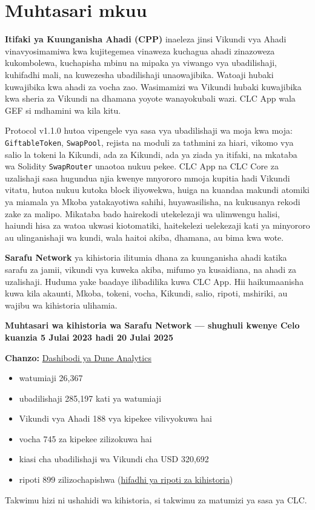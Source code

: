 \documentclass[11pt]{article}
\begin{document}
\section*{Muhtasari mkuu}

\textbf{Itifaki ya Kuunganisha Ahadi (CPP)} inaeleza jinsi Vikundi vya Ahadi vinavyosimamiwa kwa kujitegemea vinaweza kuchagua ahadi zinazoweza kukombolewa, kuchapisha mbinu na mipaka ya viwango vya ubadilishaji, kuhifadhi mali, na kuwezesha ubadilishaji unaowajibika. Watoaji hubaki kuwajibika kwa ahadi za vocha zao. Wasimamizi wa Vikundi hubaki kuwajibika kwa sheria za Vikundi na dhamana yoyote wanayokubali wazi. CLC App wala GEF si mdhamini wa kila kitu.

Protocol v1.1.0 hutoa vipengele vya sasa vya ubadilishaji wa moja kwa moja: \texttt{GiftableToken}, \texttt{SwapPool}, rejista na moduli za tathmini za hiari, vikomo vya salio la tokeni la Kikundi, ada za Kikundi, ada ya ziada ya itifaki, na mkataba wa Solidity \texttt{SwapRouter} unaotoa nukuu pekee. CLC App na CLC Core za uzalishaji sasa hugundua njia kwenye mnyororo mmoja kupitia hadi Vikundi vitatu, hutoa nukuu kutoka block iliyowekwa, huiga na kuandaa makundi atomiki ya miamala ya Mkoba yatakayotiwa sahihi, huyawasilisha, na kukusanya rekodi zake za malipo. Mikataba bado hairekodi utekelezaji wa ulimwengu halisi, haiundi hisa za watoa ukwasi kiotomatiki, haitekelezi uelekezaji kati ya minyororo au ulinganishaji wa kundi, wala haitoi akiba, dhamana, au bima kwa wote.

\textbf{Sarafu Network} ya kihistoria ilitumia dhana za kuunganisha ahadi katika sarafu za jamii, vikundi vya kuweka akiba, mifumo ya kusaidiana, na ahadi za uzalishaji. Huduma yake baadaye ilibadilika kuwa CLC App. Hii haikumaanisha kuwa kila akaunti, Mkoba, tokeni, vocha, Kikundi, salio, ripoti, mshiriki, au wajibu wa kihistoria ulihamia.

\textbf{Muhtasari wa kihistoria wa Sarafu Network --- shughuli kwenye Celo kuanzia 5 Julai 2023 hadi 20 Julai 2025}

\textbf{Chanzo:} \href{https://dune.com/grassrootseconomics/sarafu-network}{Dashibodi ya Dune Analytics}

\begin{itemize}[leftmargin=*]
\item watumiaji 26,367
\item ubadilishaji 285,197 kati ya watumiaji
\item Vikundi vya Ahadi 188 vya kipekee vilivyokuwa hai
\item vocha 745 za kipekee zilizokuwa hai
\item kiasi cha ubadilishaji wa Vikundi cha USD 320,692
\item ripoti 899 zilizochapishwa (\href{https://sarafu.network/reports}{hifadhi ya ripoti za kihistoria})
\end{itemize}
Takwimu hizi ni ushahidi wa kihistoria, si takwimu za matumizi ya sasa ya CLC.
\end{document}
